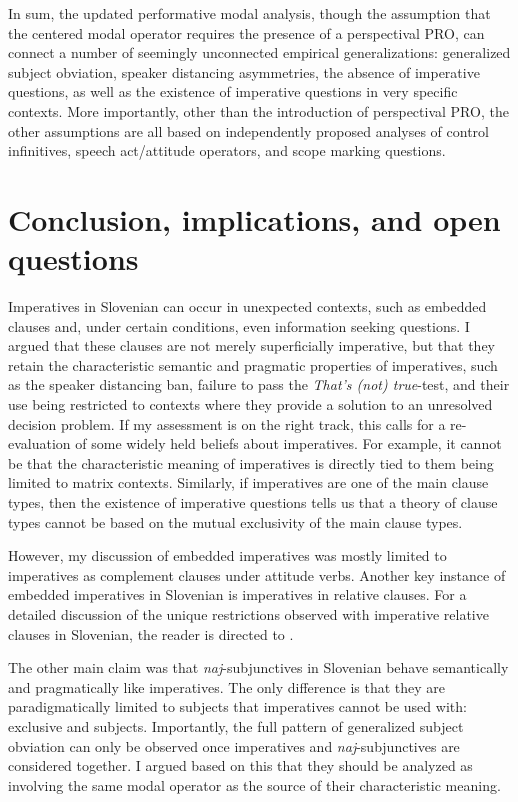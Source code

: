 \documentclass[output=paper,colorlinks,citecolor=brown]{langscibook}
\begin{document}
In sum, the updated performative modal analysis, though the assumption that the centered modal operator requires the presence of a perspectival PRO, can connect a number of seemingly unconnected empirical generalizations: generalized subject obviation, speaker distancing asymmetries, the absence of imperative questions, as well as the existence of imperative questions in very specific contexts. More importantly, other than the introduction of perspectival PRO, the other assumptions are all based on independently proposed analyses of control infinitives, speech act/attitude operators, and scope marking questions.     



\section{Conclusion, implications, and open questions}
\label{sec:discussion}

Imperatives in Slovenian can occur in unexpected contexts, such as embedded clauses and, under certain conditions, even information seeking questions. I argued that these clauses are not merely superficially imperative, but that they retain the characteristic semantic and pragmatic properties of imperatives, such as the speaker distancing ban, failure to pass the \emph{That's (not) true}-test, and their use being restricted to contexts where they provide a solution to an unresolved decision problem. If my assessment is on the right track, this calls for a re-evaluation of some widely held beliefs about imperatives. For example, it cannot be that the characteristic meaning of imperatives is directly tied to them being limited to matrix contexts. Similarly, if imperatives are one of the main clause types, then the existence of imperative questions tells us that a theory of clause types cannot be based on the mutual exclusivity of the main clause types. 

However, my discussion of embedded imperatives was mostly limited to imperatives as complement clauses under attitude verbs. Another key instance of embedded imperatives in Slovenian is imperatives in relative clauses. For a detailed discussion of the unique restrictions observed with imperative relative clauses in Slovenian, the reader is directed to \citet{kaufmannstegovec19}. 

The other main claim was that \emph{naj}-subjunctives in Slovenian behave semantically and pragmatically like imperatives. The only difference is that they are paradigmatically limited to subjects that imperatives cannot be used with: exclusive \fst{} and \trd{} subjects. Importantly, the full pattern of generalized subject obviation can only be observed once imperatives and \emph{naj}-subjunctives are considered together. I argued based on this that they should be analyzed as involving the same modal operator as the source of their characteristic meaning.    
\end{document}

